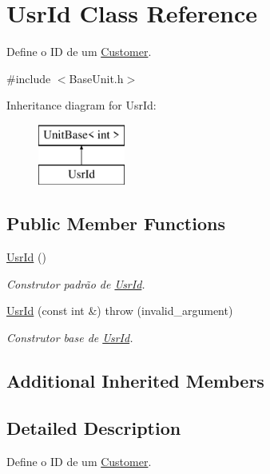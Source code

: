\hypertarget{classUsrId}{\section{Usr\-Id Class Reference}
\label{d8/dc7/classUsrId}
}


Define o I\-D de um \hyperlink{classCustomer}{Customer}.  




{\ttfamily \#include $<$Base\-Unit.\-h$>$}

Inheritance diagram for Usr\-Id\-:\begin{figure}[H]
\begin{center}
\leavevmode
\includegraphics[height=2.000000cm]{d8/dc7/classUsrId}
\end{center}
\end{figure}
\subsection*{Public Member Functions}
\begin{DoxyCompactItemize}
\item 
\hyperlink{classUsrId_a55a05b8f951a218c66c49f09fa6ce374}{Usr\-Id} ()
\begin{DoxyCompactList}\small\item\em Construtor padrão de \hyperlink{classUsrId}{Usr\-Id}. \end{DoxyCompactList}\item 
\hyperlink{classUsrId_a3be81b6f539c0121803f9d88e9d89553}{Usr\-Id} (const int \&)  throw (invalid\-\_\-argument)
\begin{DoxyCompactList}\small\item\em Construtor base de \hyperlink{classUsrId}{Usr\-Id}. \end{DoxyCompactList}\end{DoxyCompactItemize}
\subsection*{Additional Inherited Members}


\subsection{Detailed Description}
Define o I\-D de um \hyperlink{classCustomer}{Customer}. 

